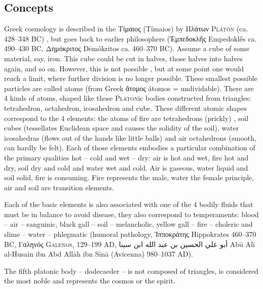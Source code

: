 \documentclass[british,final,landscape]{scrartcl}
\begin{document}
\begin{refsection}
\section{Concepts}

Greek cosmology is described in the \foreignlanguage{greek}{Τίμαιος} (Tímaios) by \foreignlanguage{greek}{Πλάτων} \textsc{Plátōn} (ca. \num{428}--\num{348} BC) \parencite{Pla-40}, but goes back to earlier philosophers (\foreignlanguage{greek}{Ἐμπεδοκλῆς} Empedoklḗs ca. \num{490}--\num{430} BC, \foreignlanguage{greek}{Δημόκριτος} Dēmókritos ca. \num{460}--\num{370} BC). Assume a cube of some material, say, iron. This cube could be cut in halves, those halves into halves again, and so on. However, this is not possible , but at some point one would reach a limit, where further division is no longer possible. These smallest possible particles are called atoms (from Greek \foreignlanguage{greek}{ἄτομος} átomos = undividable). There are \num{4} kinds of atoms, shaped like those \textsc{Platon}ic bodies constructed from triangles: tetrahedron, octahedron, icosahedron and cube. These different atomic shapes correspond to the 4 elements: the atoms of fire are tetrahedrons (prickly) , soil cubes (tessellates Euclidean space and causes the solidity of the soil), water icosahedras (flows out of the hands like little balls) and air octahedrons (smooth, can hardly be felt). Each of those elements embodies a particular combination of the primary qualities hot -- cold and wet -- dry: air is hot and wet, fire hot and dry, soil dry and cold and water wet and cold. Air is gaseous, water liquid and soil solid, fire is consuming. Fire represents the male, water the female principle, air and soil are transition elements.

Each of the basic elements is also associated with one of the 4 bodily fluids that must be in balance to avoid disease, they also correspond to temperaments: blood -- air -- sanguinic, black gall -- soil -- melancholic, yellow gall -- fire -- choleric and slime -- water -- phlegmatic (humoral pathology, \foreignlanguage{greek}{Ἱπποκράτης} Hippokrates \num{460}--\num{370} BC, \foreignlanguage{greek}{Γαληνός} \textsc{Galenos}, \num{129}--\num{199} AD, \foreignlanguage{arabic}{أبو علي الحسين بن عبد الله ابن سينا} Abū Alī al-Husain ibn Abd Allāh ibn Sīnā (Avicenna) \num{980}--\num{1037} AD).

The fifth platonic body -- dodecaeder -- is not composed of triangles, is considered the most noble and represents the cosmos or the spirit.


\end{refsection}
\end{document}
